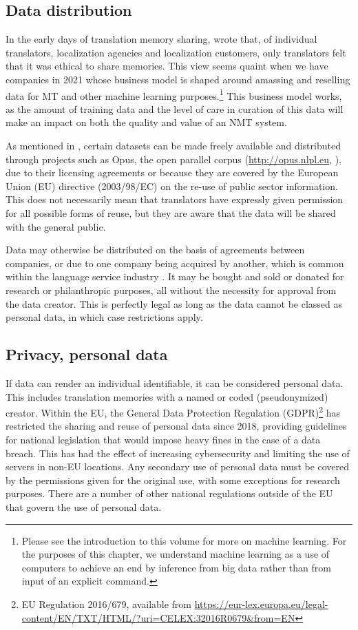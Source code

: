 \documentclass[output=paper]{langscibook}
\begin{document}
\subsection{Data distribution}

In the early days of translation memory sharing, \citet{Topping2000} wrote that, of individual translators, localization agencies and localization customers, only translators felt that it was ethical to share memories. This view seems quaint when we have companies in 2021 whose business model is shaped around amassing and reselling data for MT and other machine learning purposes.\footnote{Please see the introduction to this volume for more on machine learning. For the purposes of this chapter, we understand machine learning as a use of computers to achieve an end by inference from big data rather than from input of an explicit command.} This business model works, as the amount of training data and the level of care in curation of this data will make an impact on both the quality and value of an NMT system.

As mentioned in , certain datasets can be made freely available and distributed through projects such as Opus, the open parallel corpus (\url{http://opus.nlpl.eu}, \citealt{Tiedemann2012}), due to their licensing agreements or because they are covered by the European Union (EU) directive (2003/98/EC) on the re-use of public sector information. This does not necessarily mean that translators have expressly given permission for all possible forms of reuse, but they are aware that the data will be shared with the general public.

Data may otherwise be distributed on the basis of agreements between companies, or due to one company being acquired by another, which is common within the language service industry \citep{Moorkens2020}. It may be bought and sold or donated for research or philanthropic purposes, all without the necessity for approval from the data creator. This is perfectly legal as long as the data cannot be classed as personal data, in which case restrictions apply.

\subsection{Privacy, personal data}\label{sec:moorkens:2.5}

If data can render an individual identifiable, it can be considered personal data. This includes translation memories with a named or coded (pseudonymized) creator. Within the EU, the General Data Protection Regulation (GDPR)\footnote{EU Regulation 2016/679, available from \url{https://eur-lex.europa.eu/legal-content/EN/TXT/HTML/?uri=CELEX:32016R0679&from=EN}} has restricted the sharing and reuse of personal data since 2018, providing guidelines for national legislation that would impose heavy fines in the case of a data breach. This has had the effect of increasing cybersecurity and limiting the use of servers in non-EU locations. Any secondary use of personal data must be covered by the permissions given for the original use, with some exceptions for research purposes. There are a number of other national regulations outside of the EU that govern the use of personal data.
\end{document}
